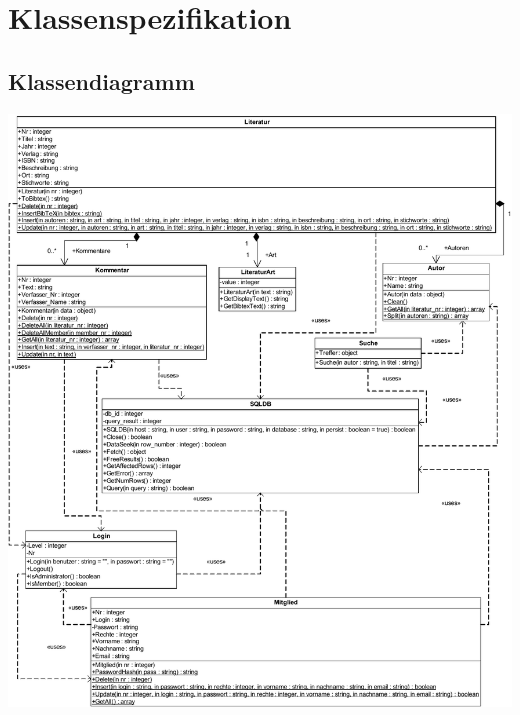 \section{Klassenspezifikation}
\subsection{Klassendiagramm}
\includegraphics[scale=0.65]{LiMan_System}










